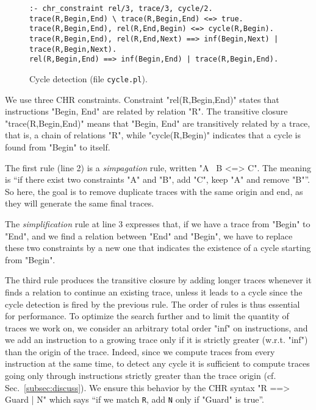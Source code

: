 \begin{figure}
\begin{lstlisting}[language=chr,basicstyle=\footnotesize\ttfamily]
:- chr_constraint rel/3, trace/3, cycle/2.
trace(R,Begin,End) \ trace(R,Begin,End) <=> true.
trace(R,Begin,End), rel(R,End,Begin) <=> cycle(R,Begin).
trace(R,Begin,End), rel(R,End,Next) ==> inf(Begin,Next) | trace(R,Begin,Next).
rel(R,Begin,End) ==> inf(Begin,End) | trace(R,Begin,End).
\end{lstlisting}
\caption{Cycle detection (file \texttt{cycle.pl}).}
\label{fig:cycleDetection}
\end{figure}

We use three CHR constraints. Constraint  "rel(R,Begin,End)" 
states that instructions "Begin, End" are related by relation "R".
The transitive closure "trace(R,Begin,End)" 
means that "Begin, End" are transitively related 
by a trace, that is, a chain of relations "R", while
"cycle(R,Begin)" indicates that a cycle is found from "Begin" to itself.


The first rule (line 2) is a {\em simpagation} rule, written
"A \ B <=> C". The meaning is ``if there exist two constraints
"A" and "B", add "C", keep "A" and remove
"B"''. So here, the goal is to remove duplicate traces
with the same origin and end, as they
will generate the same final traces.

The  {\em simplification} rule at line 3 expresses that, 
if we have a trace from "Begin" to
"End", and we find a relation between "End" and "Begin", 
we have to replace these two constraints by a new one
that indicates the existence of a cycle starting from "Begin".

The third rule produces the transitive closure by adding longer traces whenever
it finds a relation to continue an existing trace, unless it leads to a cycle 
since the cycle detection is fired by the previous rule. 
The order of rules is thus essential for performance.
To optimize the search further and to limit 
the quantity of traces we work on, we consider an arbitrary total order "inf" on 
instructions, and we add an instruction to a growing trace only if it is 
strictly greater (w.r.t. "inf") than the origin of the trace. Indeed, 
since we compute traces from every instruction at the same time, 
to detect any cycle it is sufficient to compute
traces going only through instructions 
strictly greater than the trace origin (cf. %
Sec.~\ref{subsec:discuss}). We ensure 
this behavior by the CHR syntax "R ==> Guard | N" which says ``if we match 
\texttt{R}, add \texttt{N} only if "Guard" is true''.

